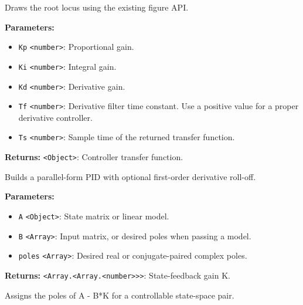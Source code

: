 \documentclass[12pt,a4paper]{article}
\begin{document}
\noindent Draws the root locus using the existing figure API.

\vspace{5mm}
\noindent {}


\noindent \textbf{Parameters:}
\begin{itemize}
  \item \texttt{Kp} \texttt{<number>}: Proportional gain.
  \item \texttt{Ki} \texttt{<number>}: Integral gain.
  \item \texttt{Kd} \texttt{<number>}: Derivative gain.
  \item \texttt{Tf} \texttt{<number>}: Derivative filter time constant. Use a positive value for a proper derivative controller.
  \item \texttt{Ts} \texttt{<number>}: Sample time of the returned transfer function.
\end{itemize}

\noindent \textbf{Returns:} \texttt{<Object>}: Controller transfer function.

\noindent Builds a parallel-form PID with optional first-order derivative roll-off.

\vspace{5mm}
\noindent {}


\noindent \textbf{Parameters:}
\begin{itemize}
  \item \texttt{A} \texttt{<Object>}: State matrix or linear model.
  \item \texttt{B} \texttt{<Array>}: Input matrix, or desired poles when passing a model.
  \item \texttt{poles} \texttt{<Array>}: Desired real or conjugate-paired complex poles.
\end{itemize}

\noindent \textbf{Returns:} \texttt{<Array.<Array.<number>>>}: State-feedback gain K.

\noindent Assigns the poles of A - B*K for a controllable state-space pair.

\vspace{5mm}
\noindent {}
\end{document}
